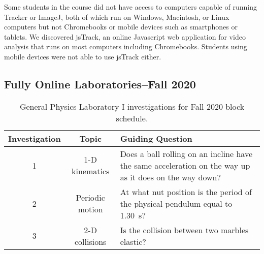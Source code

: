 \documentclass[aip, numerical, preprint]{revtex4-2}
\begin{document}
Some students in the course did not have access to computers capable of running Tracker or ImageJ, both of which run on Windows, Macintosh, or Linux computers but not Chromebooks or mobile devices such as smartphones or tablets. We discovered jsTrack\citep{jstrack}, an online Javascript web application for video analysis that runs on most computers including Chromebooks. Students using mobile devices were not able to use jsTrack either.

\subsection{Fully Online Laboratories--Fall 2020}

\begin{table}
    \caption{\label{tab: 1251 fall} General Physics Laboratory I investigations for Fall 2020 block schedule.}
    \begin{ruledtabular}
        \begin{tabular}{ccp{28em}}
            Investigation & Topic & Guiding Question\\
            \hline
            1 & 1-D kinematics & Does a ball rolling on an incline have the same acceleration on the way up as it does on the way down? \\
            2 & Periodic motion & At what nut position is the period of the physical pendulum equal to \SI{1.30}{s}? \\
            3 & 2-D collisions & Is the collision between two marbles elastic?
        \end{tabular}
    \end{ruledtabular}
\end{table}
\end{document}
